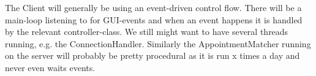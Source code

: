 The Client will generally be using an event-driven control flow. There will be a main-loop listening to for GUI-events and when an event happens it is handled by the relevant controller-class. We still might want to have several threads running, e.g. the ConnectionHandler. Similarly the AppointmentMatcher running on the server will probably be pretty procedural as it is run x times a day and never even waits events.

